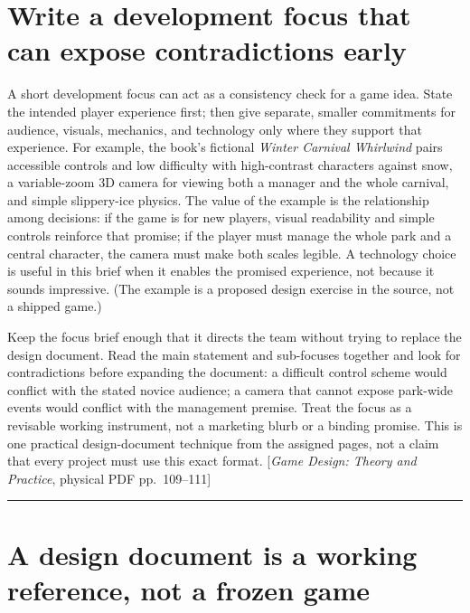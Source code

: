 \section{Write a development focus that can expose contradictions early}\label{06-engine-ii-ch046-write-a-development-focus-that-can-expose-contradictions-early}

A short development focus can act as a consistency check for a game idea. State the intended player experience first; then give separate, smaller commitments for audience, visuals, mechanics, and technology only where they support that experience. For example, the book's fictional \emph{Winter Carnival Whirlwind} pairs accessible controls and low difficulty with high-contrast characters against snow, a variable-zoom 3D camera for viewing both a manager and the whole carnival, and simple slippery-ice physics. The value of the example is the relationship among decisions: if the game is for new players, visual readability and simple controls reinforce that promise; if the player must manage the whole park and a central character, the camera must make both scales legible. A technology choice is useful in this brief when it enables the promised experience, not because it sounds impressive. (The example is a proposed design exercise in the source, not a shipped game.)

Keep the focus brief enough that it directs the team without trying to replace the design document. Read the main statement and sub-focuses together and look for contradictions before expanding the document: a difficult control scheme would conflict with the stated novice audience; a camera that cannot expose park-wide events would conflict with the management premise. Treat the focus as a revisable working instrument, not a marketing blurb or a binding promise. This is one practical design-document technique from the assigned pages, not a claim that every project must use this exact format. {[}\emph{Game Design: Theory and Practice}, physical PDF pp.~109--111{]}

\begin{center}\rule{0.5\linewidth}{0.5pt}\end{center}

\section{A design document is a working reference, not a frozen game}\label{06-engine-ii-ch046-a-design-document-is-a-working-reference-not-a-frozen-game}

